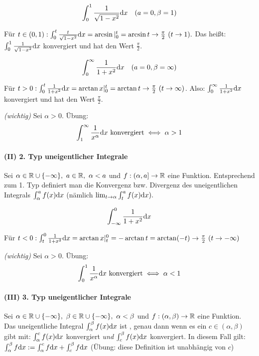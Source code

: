 \documentclass[a4paper,twoside,DIV15,BCOR12mm]{scrbook}
\begin{document}
\begin{beispiele}
\item $$\int_0^1 \frac{1}{\sqrt{1-x^2}}\text{d}x\quad(a=0,\beta=1)$$

Für $t \in (0,1): \int_0^t \frac{t}{\sqrt{1-x^2}}\dx = \arcsin|_0^t = \arcsin t \to \frac{\pi}{2}\ (t \to 1).$ Das heißt: $\int_0^1 \frac{1}{\sqrt{1-x^2}}\text{d}x$ konvergiert und hat den Wert $\frac{\pi}{2}$.

\item $$\int_0^\infty \frac{1}{1+x^2}\text{d}x\quad(a=0,\beta=\infty)$$

Für $t>0: \int_0^t \frac{1}{1+x^2}\text{d}x = \arctan x|_0^t = \arctan t \to \frac{\pi}{2}\ (t \to \infty)$. Also: $\int_0^\infty \frac{1}{1+x^2}\text{d}x$ konvergiert und hat den Wert $\frac{\pi}{2}$.

\item \textit{(wichtig)} Sei $\alpha > 0$. Übung: $$\int_1^\infty \frac{1}{x^\alpha}\text{d}x\text{ konvergiert} \iff \alpha > 1$$
\end{beispiele}

\paragraph{(II) 2. Typ uneigentlicher Integrale}
Sei $\alpha \in \mathbb{R} \cup \{-\infty\},\ a \in \mathbb{R},\ \alpha < a$ und $f:(\alpha,a] \to \mathbb{R}$ eine Funktion. Entsprechend zum 1. Typ definiert man die Konvergenz bzw. Divergenz des uneigentlichen Integrals $\int_\alpha^a f(x) \text{d}x$ (nämlich $\lim_{t\to\alpha} \int_t^a f(x)\text{d}x).$

\begin{beispiele}
\item $$\int_{-\infty}^0 \frac{1}{1+x^2}\text{d}x$$

Für $t<0: \int_t^0 \frac{1}{1+x^2}\text{d}x = \arctan x|_t^0 = -\arctan t = \arctan (-t) \to \frac{\pi}{2}\ (t \to -\infty)$

\item \textit{(wichtig)} Sei $\alpha > 0.$ Übung: $$\int_0^1 \frac{1}{x^\alpha}\text{d}x\text{ konvergiert} \iff \alpha < 1$$
\end{beispiele}

\paragraph{(III) 3. Typ uneigentlicher Integrale}
Sei $\alpha \in \MdR \cup \{-\infty\},\ \beta \in \MdR \cup \{-\infty\},\ \alpha < \beta$ und $f:(\alpha,\beta) \to \mathbb{R}$ eine Funktion. Das uneigentliche Integral $\int_\alpha^\beta f(x)\text{d}x$ ist , genau dann wenn es ein $c \in (\alpha,\beta)$ gibt mit: $\int_\alpha^c f(x)\text{d}x$ konvergiert \emph{und} $\int_c^\beta f(x)\text{d}x$ konvergiert. In diesem Fall gilt: $\int_\alpha^\beta f\text{d}x := \int_\alpha^c f\text{d}x + \int_c^\beta f\text{d}x$ (Übung: diese Definition ist unabhängig von $c$)
\end{document}
